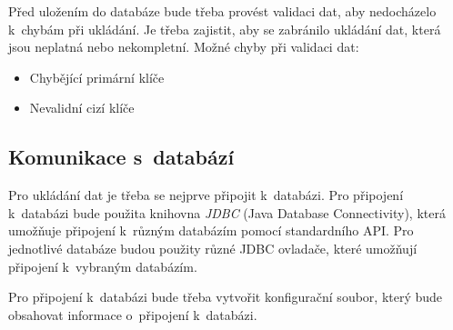 Před uložením do databáze bude třeba provést validaci dat, aby nedocházelo k~chybám při
ukládání. Je třeba zajistit, aby se zabránilo ukládání dat, která jsou neplatná nebo nekompletní.
Možné chyby při validaci dat:
\begin{itemize}
    \item Chybějící primární klíče
    \item Nevalidní cizí klíče
\end{itemize}

\subsection{Komunikace s~databází}
\label{sec:komunikaceDB}
Pro ukládání dat je třeba se nejprve připojit k~databázi.
Pro připojení k~databázi bude použita knihovna \textit{JDBC} (Java Database Connectivity), která
umožňuje připojení k~různým databázím pomocí standardního API.
Pro jednotlivé databáze budou použity různé JDBC ovladače, které umožňují připojení k~vybraným databázím.

Pro připojení k~databázi bude třeba vytvořit konfigurační soubor, který bude obsahovat
informace o~připojení k~databázi.